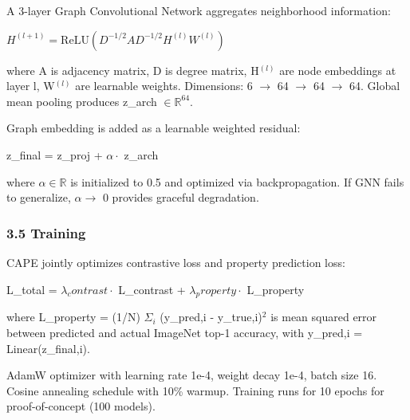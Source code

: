 A 3-layer Graph Convolutional Network aggregates neighborhood information:

$H^{(l+1)} = \mathrm{ReLU}(D^{-1/2} A D^{-1/2} H^{(l)} W^{(l)})$

where A is adjacency matrix, D is degree matrix, H$^{(l)}$ are node embeddings at layer l, W$^{(l)}$ are learnable weights. Dimensions: 6 $\rightarrow$ 64 $\rightarrow$ 64 $\rightarrow$ 64. Global mean pooling produces z\_arch $\in \mathbb{R}^64$.

Graph embedding is added as a learnable weighted residual:

z\_final = z\_proj + $\alpha \cdot$ z\_arch

where $\alpha \in \mathbb{R}$ is initialized to 0.5 and optimized via backpropagation. If GNN fails to generalize, $\alpha \rightarrow$ 0 provides graceful degradation.

\subsubsection{3.5 Training}

CAPE jointly optimizes contrastive loss and property prediction loss:

L\_total = $\lambda _contrast \cdot$ L\_contrast + $\lambda _property \cdot$ L\_property

where L\_property = (1/N) $\Sigma _i$ (y\_pred,i - y\_true,i)$^2$ is mean squared error between predicted and actual ImageNet top-1 accuracy, with y\_pred,i = Linear(z\_final,i).

AdamW optimizer with learning rate 1e-4, weight decay 1e-4, batch size 16. Cosine annealing schedule with 10\% warmup. Training runs for 10 epochs for proof-of-concept (100 models).
